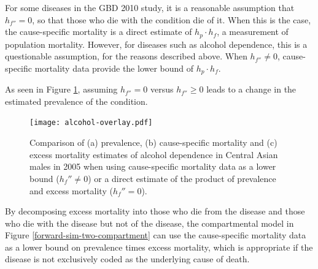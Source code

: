 For some diseases in the GBD 2010 study, it is a reasonable assumption
that $h_{f''} = 0$, so that those who die with the condition die of
it.  When this is the case, the cause-specific mortality is a direct
estimate of $h_{p} \cdot h_{f}$, a measurement of population
mortality.  However, for diseases such as alcohol dependence, this is
a questionable assumption, for the reasons described above.  When
$h_{f''} \neq 0$, cause-specific mortality data provide the lower
bound of $h_{p} \cdot h_{f}$.

As seen in Figure \ref{fig:app-alcohol compare}, assuming $h_{f''}=0$
versus $h_{f''}\geq 0$ leads to a change in the estimated prevalence
of the condition.

    \begin{figure}[h]
        \begin{center}
            \texttt{[image: alcohol-overlay.pdf]}
            \caption{Comparison of (a) prevalence,
              (b) cause-specific mortality and (c) excess
              mortality estimates of alcohol
              dependence in Central Asian males in 2005 when using
              cause-specific mortality data as a lower bound ($h_f'' \neq 0$)
              or a direct estimate of the product of
              prevalence and excess mortality ($h_f'' = 0$).}
            \label{fig:app-alcohol compare}
        \end{center}
    \end{figure}

By decomposing excess mortality into those who die from the
disease and those who die with the disease but not of the disease, the
compartmental model in Figure \ref{forward-sim-two-compartment} can
use the cause-specific mortality data as a lower bound on prevalence
times excess mortality, which is appropriate if the
disease is not exclusively coded as the underlying cause of death.
